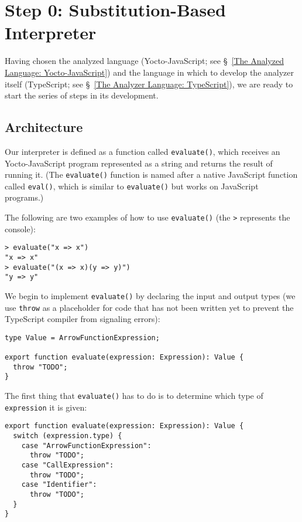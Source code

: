 \documentclass[12pt, oneside]{book}
\begin{document}
\section{Step 0: Substitution-Based Interpreter}
\label{Step 0: Substitution-Based Interpreter}

Having chosen the analyzed language (Yocto-JavaScript; see §~\ref{The Analyzed Language: Yocto-JavaScript}) and the language in which to develop the analyzer itself (TypeScript; see §~\ref{The Analyzer Language: TypeScript}), we are ready to start the series of steps in its development.


\subsection{Architecture}

Our interpreter is defined as a function called \texttt{evaluate()}, which receives an Yocto-JavaScript program represented as a string and returns the result of running it. (The \texttt{evaluate()} function is named after a native JavaScript function called \texttt{eval()}, which is similar to \texttt{evaluate()} but works on JavaScript programs.)

The following are two examples of how to use \texttt{evaluate()} (the \texttt{>} represents the console):

\begin{verbatim}
> evaluate("x => x")
"x => x"
> evaluate("(x => x)(y => y)")
"y => y"
\end{verbatim}

We begin to implement \texttt{evaluate()} by declaring the input and output types (we use \texttt{throw} as a placeholder for code that has not been written yet to prevent the TypeScript compiler from signaling errors):

\begin{verbatim}
type Value = ArrowFunctionExpression;

export function evaluate(expression: Expression): Value {
  throw "TODO";
}
\end{verbatim}

The first thing that \texttt{evaluate()} has to do is to determine which type of \texttt{expression} it is given:

\begin{verbatim}
export function evaluate(expression: Expression): Value {
  switch (expression.type) {
    case "ArrowFunctionExpression":
      throw "TODO";
    case "CallExpression":
      throw "TODO";
    case "Identifier":
      throw "TODO";
  }
}
\end{verbatim}
\end{document}
